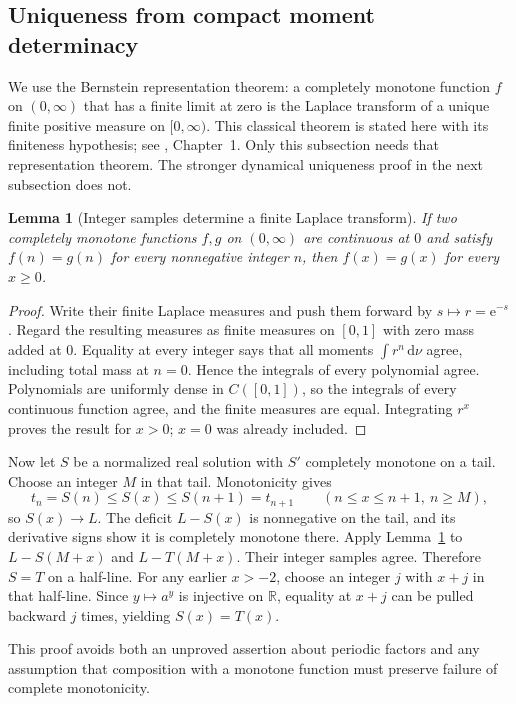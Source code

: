 \documentclass[11pt,letterpaper]{article}
\newtheorem{lemma}[theorem]{Lemma}
\theoremstyle{definition}\newtheorem{definition}[theorem]{Definition}
\theoremstyle{remark}\newtheorem{remark}[theorem]{Remark}
\newcommand{\R}{\mathbb R}
\newcommand{\dd}{\,\mathrm d}
\newcommand{\ee}{\mathrm e}
\numberwithin{equation}{section}
\begin{document}
\subsection{Uniqueness from compact moment determinacy}
We use the Bernstein representation theorem: a completely monotone function $f$ on $(0,\infty)$ that has a finite limit at zero is the Laplace transform of a unique finite positive measure on $[0,\infty)$. This classical theorem is stated here with its finiteness hypothesis; see \cite{BernsteinBook}, Chapter~1. Only this subsection needs that representation theorem. The stronger dynamical uniqueness proof in the next subsection does not.

\begin{lemma}[Integer samples determine a finite Laplace transform]\label{lem:momunique}
If two completely monotone functions $f,g$ on $(0,\infty)$ are continuous at $0$ and satisfy $f(n)=g(n)$ for every nonnegative integer $n$, then $f(x)=g(x)$ for every $x\geq0$.
\end{lemma}
\begin{proof}
Write their finite Laplace measures and push them forward by $s\mapsto r=\ee^{-s}$. Regard the resulting measures as finite measures on $[0,1]$ with zero mass added at $0$. Equality at every integer says that all moments $\int r^n\dd\nu$ agree, including total mass at $n=0$. Hence the integrals of every polynomial agree. Polynomials are uniformly dense in $C([0,1])$, so the integrals of every continuous function agree, and the finite measures are equal. Integrating $r^x$ proves the result for $x>0$; $x=0$ was already included.
\end{proof}

Now let $S$ be a normalized real solution with $S'$ completely monotone on a tail. Choose an integer $M$ in that tail. Monotonicity gives
\[
 t_n=S(n)\leq S(x)\leq S(n+1)=t_{n+1}\qquad(n\leq x\leq n+1,\ n\geq M),
\]
so $S(x)\to L$. The deficit $L-S(x)$ is nonnegative on the tail, and its derivative signs show it is completely monotone there. Apply Lemma~\ref{lem:momunique} to $L-S(M+x)$ and $L-T(M+x)$. Their integer samples agree. Therefore $S=T$ on a half-line. For any earlier $x>-2$, choose an integer $j$ with $x+j$ in that half-line. Since $y\mapsto a^y$ is injective on $\R$, equality at $x+j$ can be pulled backward $j$ times, yielding $S(x)=T(x)$.

This proof avoids both an unproved assertion about periodic factors and any assumption that composition with a monotone function must preserve failure of complete monotonicity.
\end{document}
